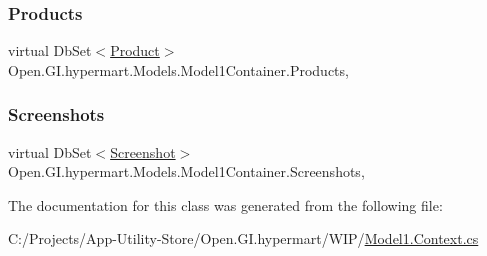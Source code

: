 \hypertarget{class_open_1_1_g_i_1_1hypermart_1_1_models_1_1_model1_container_a3152c9cb162bad57e707fb1a6b48152c}{}\label{class_open_1_1_g_i_1_1hypermart_1_1_models_1_1_model1_container_a3152c9cb162bad57e707fb1a6b48152c} 
\subsubsection{\texorpdfstring{Products}{Products}}
{\footnotesize\ttfamily virtual Db\+Set$<$\hyperlink{class_open_1_1_g_i_1_1hypermart_1_1_models_1_1_product}{Product}$>$ Open.\+G\+I.\+hypermart.\+Models.\+Model1\+Container.\+Products\hspace{0.3cm}{\ttfamily [get]}, {\ttfamily [set]}}

\hypertarget{class_open_1_1_g_i_1_1hypermart_1_1_models_1_1_model1_container_a16840948ed271ebac66728f3398b6696}{}\label{class_open_1_1_g_i_1_1hypermart_1_1_models_1_1_model1_container_a16840948ed271ebac66728f3398b6696} 
\subsubsection{\texorpdfstring{Screenshots}{Screenshots}}
{\footnotesize\ttfamily virtual Db\+Set$<$\hyperlink{class_open_1_1_g_i_1_1hypermart_1_1_models_1_1_screenshot}{Screenshot}$>$ Open.\+G\+I.\+hypermart.\+Models.\+Model1\+Container.\+Screenshots\hspace{0.3cm}{\ttfamily [get]}, {\ttfamily [set]}}



The documentation for this class was generated from the following file\+:\begin{DoxyCompactItemize}
\item 
C\+:/\+Projects/\+App-\/\+Utility-\/\+Store/\+Open.\+G\+I.\+hypermart/\+W\+I\+P/\hyperlink{_model1_8_context_8cs}{Model1.\+Context.\+cs}\end{DoxyCompactItemize}
